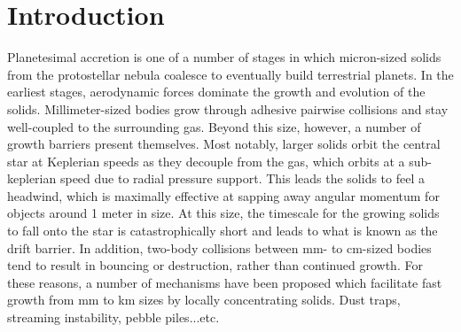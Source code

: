 \documentclass[twocolumn]{aastex63}
\begin{document}

\section{Introduction} \label{sec:intro}

Planetesimal accretion is one of a number of stages in which micron-sized solids from the protostellar nebula coalesce to eventually build terrestrial planets. In the earliest stages, aerodynamic forces dominate the growth and evolution of the solids. Millimeter-sized bodies grow through adhesive pairwise collisions and stay well-coupled to the surrounding gas. Beyond this size, however, a number of growth barriers present themselves. Most notably, larger solids orbit the central star at Keplerian speeds as they decouple from the gas, which orbits at a sub-keplerian speed due to radial pressure support. This leads the solids to feel a headwind, which is maximally effective at sapping away angular momentum for objects around 1 meter in size. At this size, the timescale for the growing solids to fall onto the star is catastrophically short and leads to what is known as the drift barrier. In addition, two-body collisions between mm- to cm-sized bodies tend to result in bouncing or destruction, rather than continued growth. For these reasons, a number of mechanisms have been proposed which facilitate fast growth from mm to km sizes by locally concentrating solids. Dust traps, streaming instability, pebble piles...etc.
\end{document}
